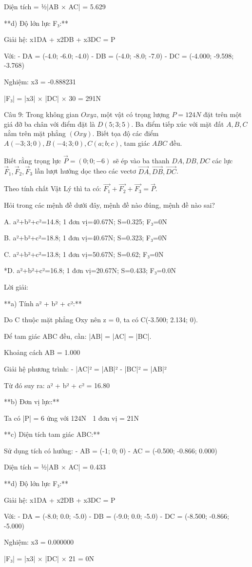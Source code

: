 \documentclass[a4paper,12pt]{article}
\begin{document}
Diện tích = ½|AB⃗ × AC⃗| = 5.629

**d) Độ lớn lực F₃:**

Giải hệ: x1DA⃗ + x2DB⃗ + x3DC⃗ = P⃗

Với:
- DA⃗ = (-4.0; -6.0; -4.0)
- DB⃗ = (-4.0; -8.0; -7.0)
- DC⃗ = (-4.000; -9.598; -3.768)

Nghiệm: x3 = -0.888231

|F₃| = |x3| × |DC⃗| × 30 = 291N




Câu 9: Trong không gian \(Oxyz\), một vật có trọng lượng \(P=124N\) đặt trên một giá đỡ ba chân với điểm đặt là \(D(5; 3; 5)\). Ba điểm tiếp xúc với mặt đất \(A, B, C\) nằm trên mặt phẳng \((Oxy)\). Biết tọa độ các điểm \(A(-3; 3; 0), B(-4; 3; 0), C(a; b; c)\), tam giác \(ABC\) đều. 

Biết rằng trọng lực \(\overrightarrow{P}=(0; 0; -6)\) sẽ ép vào ba thanh \(DA, DB, DC\) các lực \(\overrightarrow{F}_1, \overrightarrow{F}_2, \overrightarrow{F}_3\) lần lượt hướng dọc theo các vectơ \(\overrightarrow{DA}, \overrightarrow{DB}, \overrightarrow{DC}\). 

Theo tính chất Vật Lý thì ta có: \(\overrightarrow{F_1}+\overrightarrow{F_2}+\overrightarrow{F_3}=\overrightarrow{P}\).

Hỏi trong các mệnh đề dưới đây, mệnh đề nào đúng, mệnh đề nào sai?

A. a²+b²+c²=14.8; 1 đơn vị=40.67N; S=0.325; F₃=0N

B. a²+b²+c²=18.8; 1 đơn vị=40.67N; S=0.323; F₃=0N

C. a²+b²+c²=13.8; 1 đơn vị=50.67N; S=0.62; F₃=0N

*D. a²+b²+c²=16.8; 1 đơn vị=20.67N; S=0.433; F₃=0.0N

Lời giải:


**a) Tính a² + b² + c²:**

Do C thuộc mặt phẳng Oxy nên z = 0, ta có C(-3.500; 2.134; 0).

Để tam giác ABC đều, cần: |AB| = |AC| = |BC|.

Khoảng cách AB = 1.000

Giải hệ phương trình:
- |AC|² = |AB|²  
- |BC|² = |AB|²

Từ đó suy ra: a² + b² + c² = 16.80

**b) Đơn vị lực:**

Ta có |P⃗| = 6 ứng với 124N
⟹ 1 đơn vị = 21N

**c) Diện tích tam giác ABC:**

Sử dụng tích có hướng:
- AB⃗ = (-1; 0; 0)
- AC⃗ = (-0.500; -0.866; 0.000)

Diện tích = ½|AB⃗ × AC⃗| = 0.433

**d) Độ lớn lực F₃:**

Giải hệ: x1DA⃗ + x2DB⃗ + x3DC⃗ = P⃗

Với:
- DA⃗ = (-8.0; 0.0; -5.0)
- DB⃗ = (-9.0; 0.0; -5.0)
- DC⃗ = (-8.500; -0.866; -5.000)

Nghiệm: x3 = 0.000000

|F₃| = |x3| × |DC⃗| × 21 = 0N
\end{document}
